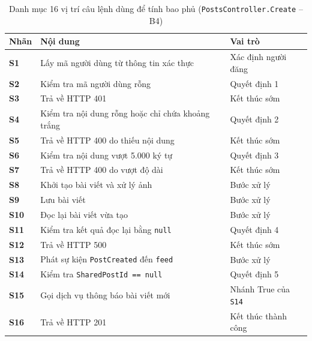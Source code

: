\documentclass[11pt,a4paper]{article}
\begin{document}
\begin{table}[H]
\centering
\scriptsize
\begin{tabularx}{\textwidth}{|C{1.3cm}|X|L{4.0cm}|}
\hline
{}
\textbf{Nhãn} & \textbf{Nội dung} & \textbf{Vai trò} \tabularnewline
\hline
\textbf{S1} & Lấy mã người dùng từ thông tin xác thực & Xác định người đăng \\ \hline
\textbf{S2} & Kiểm tra mã người dùng rỗng & Quyết định 1 \\ \hline
\textbf{S3} & Trả về HTTP 401 & Kết thúc sớm \\ \hline
\textbf{S4} & Kiểm tra nội dung rỗng hoặc chỉ chứa khoảng trắng & Quyết định 2 \\ \hline
\textbf{S5} & Trả về HTTP 400 do thiếu nội dung & Kết thúc sớm \\ \hline
\textbf{S6} & Kiểm tra nội dung vượt 5.000 ký tự & Quyết định 3 \\ \hline
\textbf{S7} & Trả về HTTP 400 do vượt độ dài & Kết thúc sớm \\ \hline
\textbf{S8} & Khởi tạo bài viết và xử lý ảnh & Bước xử lý \\ \hline
\textbf{S9} & Lưu bài viết & Bước xử lý \\ \hline
\textbf{S10} & Đọc lại bài viết vừa tạo & Bước xử lý \\ \hline
\textbf{S11} & Kiểm tra kết quả đọc lại bằng \texttt{null} & Quyết định 4 \\ \hline
\textbf{S12} & Trả về HTTP 500 & Kết thúc sớm \\ \hline
\textbf{S13} & Phát sự kiện \texttt{PostCreated} đến \texttt{feed} & Bước xử lý \\ \hline
\textbf{S14} & Kiểm tra \texttt{SharedPostId == null} & Quyết định 5 \\ \hline
\textbf{S15} & Gọi dịch vụ thông báo bài viết mới & Nhánh True của \texttt{S14} \\ \hline
\textbf{S16} & Trả về HTTP 201 & Kết thúc thành công \\ \hline
\end{tabularx}
\caption{Danh mục 16 vị trí câu lệnh dùng để tính bao phủ (\texttt{PostsController.Create} -- B4)}
\end{table}
\end{document}
